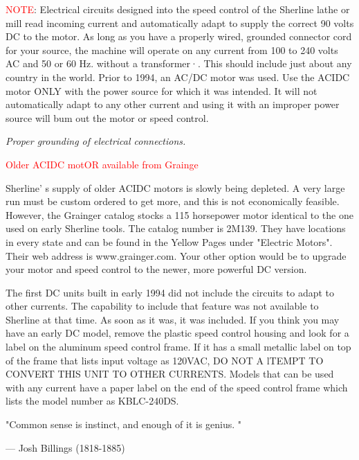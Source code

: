 \textcolor{Red}{NOTE}: Electrical circuits designed into the speed control of
the Sherline lathe or mill read incoming current and automatically adapt to
supply the correct 90 volts DC to the motor. As long as you have a properly
wired, grounded connector cord for your source, the machine will operate on any
current from 100 to 240 volts AC and 50 or 60 Hz. without a transformer·. This
should include just about any country in the world. Prior to 1994, an AC/DC
motor was used. Use the ACIDC motor ONLY with the power source for which it was
intended. It will not automatically adapt to any other current and using it with
an improper power source will bum out the motor or speed control.

\bigskip\textit{Proper grounding of electrical connections.}\bigskip

\textcolor{Red}{Older ACIDC motOR available from Grainge}\bigskip

Sherline' s supply of older ACIDC motors is slowly being depleted. A very large
run must be custom ordered to get more, and this is not economically feasible.
However, the Grainger catalog stocks a 115 horsepower motor identical to the one
used on early Sherline tools. The catalog number is 2M139.
They have locations in every state and can be found in the Yellow Pages under
"Electric Motors". Their web address is www.grainger.com. Your other option
would be to upgrade your motor and speed control to the newer, more powerful DC
version.

\bigskip
\noindent * The first DC units built in early 1994 did not include the circuits
to adapt to other currents. The capability to include that feature was not available to
Sherline at that time. As soon as it was, it was included. If you think you may
have an early DC model, remove the plastic speed control housing and look for a
label on the aluminum speed control frame. If it has a small metallic label on
top of the frame that lists input voltage as 120VAC, DO NOT A lTEMPT TO CONVERT
THIS UNIT TO OTHER CURRENTS. Models that can be used with any current have a
paper label on the end of the speed control frame which lists the model number
as KBLC-240DS.

\bigskip
"Common sense is instinct, and enough of it is genius. "

--- Josh Billings (1818-1885)
  
\secup\secup